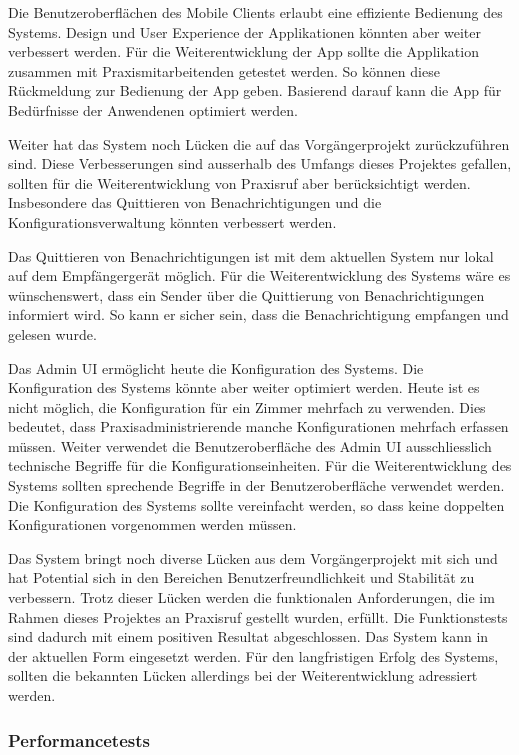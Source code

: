 Die Benutzeroberflächen des Mobile Clients erlaubt eine effiziente Bedienung des Systems.
Design und User Experience der Applikationen könnten aber weiter verbessert werden.
Für die Weiterentwicklung der App sollte die Applikation zusammen mit Praxismitarbeitenden getestet werden.
So können diese Rückmeldung zur Bedienung der App geben.
Basierend darauf kann die App für Bedürfnisse der Anwendenen optimiert werden.

Weiter hat das System noch Lücken die auf das Vorgängerprojekt zurückzuführen sind.
Diese Verbesserungen sind ausserhalb des Umfangs dieses Projektes gefallen, sollten für die Weiterentwicklung von Praxisruf aber berücksichtigt werden.
Insbesondere das Quittieren von Benachrichtigungen und die Konfigurationsverwaltung könnten verbessert werden.

Das Quittieren von Benachrichtigungen ist mit dem aktuellen System nur lokal auf dem Empfängergerät möglich.
Für die Weiterentwicklung des Systems wäre es wünschenswert, dass ein Sender über die Quittierung von Benachrichtigungen informiert wird.
So kann er sicher sein, dass die Benachrichtigung empfangen und gelesen wurde.

Das Admin UI ermöglicht heute die Konfiguration des Systems.
Die Konfiguration des Systems könnte aber weiter optimiert werden.
Heute ist es nicht möglich, die Konfiguration für ein Zimmer mehrfach zu verwenden.
Dies bedeutet, dass Praxisadministrierende manche Konfigurationen mehrfach erfassen müssen.
Weiter verwendet die Benutzeroberfläche des Admin UI ausschliesslich technische Begriffe für die Konfigurationseinheiten.
Für die Weiterentwicklung des Systems sollten sprechende Begriffe in der Benutzeroberfläche verwendet werden.
Die Konfiguration des Systems sollte vereinfacht werden, so dass keine doppelten Konfigurationen vorgenommen werden müssen.

Das System bringt noch diverse Lücken aus dem Vorgängerprojekt mit sich und hat Potential sich in den Bereichen Benutzerfreundlichkeit und Stabilität zu verbessern.
Trotz dieser Lücken werden die funktionalen Anforderungen, die im Rahmen dieses Projektes an Praxisruf gestellt wurden, erfüllt.
Die Funktionstests sind dadurch mit einem positiven Resultat abgeschlossen.
Das System kann in der aktuellen Form eingesetzt werden.
Für den langfristigen Erfolg des Systems, sollten die bekannten Lücken allerdings bei der Weiterentwicklung adressiert werden.

\subsubsection{Performancetests}

